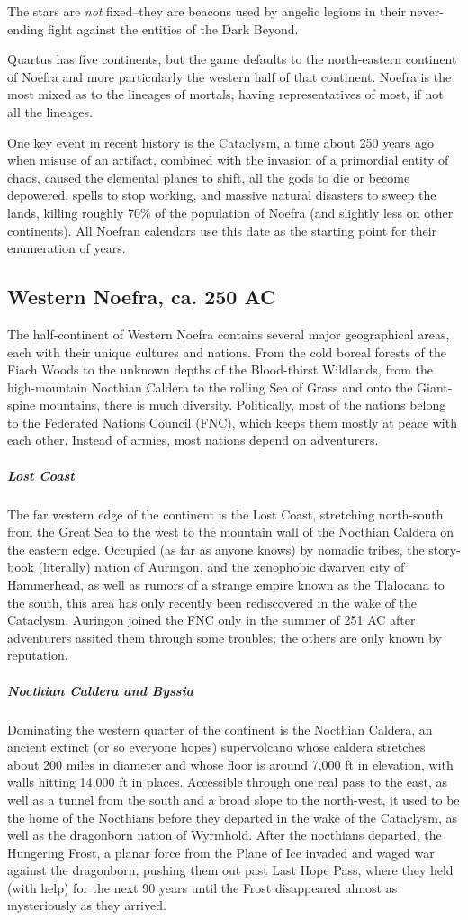 The stars are \textit{not} fixed--they are beacons used by angelic legions in their never-ending fight against the entities of the Dark Beyond.

Quartus has five continents, but the game defaults to the north-eastern continent of Noefra and more particularly the western half of that continent. Noefra is the most mixed as to the lineages of mortals, having representatives of most, if not all the lineages.

One key event in recent history is the Cataclysm, a time about 250 years ago when misuse of an artifact, combined with the invasion of a primordial entity of chaos, caused the elemental planes to shift, all the gods to die or become depowered, spells to stop working, and massive natural disasters to sweep the lands, killing roughly 70\% of the population of Noefra (and slightly less on other continents). All Noefran calendars use this date as the starting point for their enumeration of years.

\subsection{Western Noefra, ca. 250 AC}
The half-continent of Western Noefra contains several major geographical areas, each with their unique cultures and nations. From the cold boreal forests of the Fiach Woods to the unknown depths of the Blood-thirst Wildlands, from the high-mountain Nocthian Caldera to the rolling Sea of Grass and onto the Giant-spine mountains, there is much diversity. Politically, most of the nations belong to the Federated Nations Council (FNC), which keeps them mostly at peace with each other. Instead of armies, most nations depend on adventurers.

\subparagraph*{Lost Coast} The far western edge of the continent is the Lost Coast, stretching north-south from the Great Sea to the west to the mountain wall of the Nocthian Caldera on the eastern edge. Occupied (as far as anyone knows) by nomadic tribes, the story-book (literally) nation of Auringon, and the xenophobic dwarven city of Hammerhead, as well as rumors of a strange empire known as the Tlalocana to the south, this area has only recently been rediscovered in the wake of the Cataclysm. Auringon joined the FNC only in the summer of 251 AC after adventurers assited them through some troubles; the others are only known by reputation.

\subparagraph*{Nocthian Caldera and Byssia} Dominating the western quarter of the continent is the Nocthian Caldera, an ancient extinct (or so everyone hopes) supervolcano whose caldera stretches about 200 miles in diameter and whose floor is around 7,000 ft in elevation, with walls hitting 14,000 ft in places. Accessible through one real pass to the east, as well as a tunnel from the south and a broad slope to the north-west, it used to be the home of the Nocthians before they departed in the wake of the Cataclysm, as well as the dragonborn nation of Wyrmhold. After the nocthians departed, the Hungering Frost, a planar force from the Plane of Ice invaded and waged war against the dragonborn, pushing them out past Last Hope Pass, where they held (with help) for the next 90 years until the Frost disappeared almost as mysteriously as they arrived.


